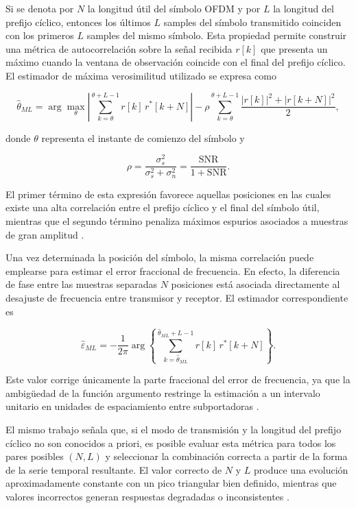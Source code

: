 Si se denota por $N$ la longitud útil del símbolo OFDM y por $L$ la longitud del prefijo cíclico, entonces los últimos $L$ samples del símbolo transmitido coinciden con los primeros $L$ samples del mismo símbolo. Esta propiedad permite construir una métrica de autocorrelación sobre la señal recibida $r[k]$ que presenta un máximo cuando la ventana de observación coincide con el final del prefijo cíclico. El estimador de máxima verosimilitud utilizado se expresa como

\begin{equation}
\hat{\theta}_{ML}
=
\arg \max_{\theta}
\left|
\sum_{k=\theta}^{\theta+L-1} r[k]\,r^{*}[k+N]
\right|
-
\rho
\sum_{k=\theta}^{\theta+L-1}
\frac{|r[k]|^2 + |r[k+N]|^2}{2},
\end{equation}

donde $\theta$ representa el instante de comienzo del símbolo y

\begin{equation}
\rho = \frac{\sigma_s^2}{\sigma_s^2+\sigma_n^2}
      = \frac{\mathrm{SNR}}{1+\mathrm{SNR}}.
\end{equation}

El primer término de esta expresión favorece aquellas posiciones en las cuales existe una alta correlación entre el prefijo cíclico y el final del símbolo útil, mientras que el segundo término penaliza máximos espurios asociados a muestras de gran amplitud \cite{uruguay_rx}.

Una vez determinada la posición del símbolo, la misma correlación puede emplearse para estimar el error fraccional de frecuencia. En efecto, la diferencia de fase entre las muestras separadas $N$ posiciones está asociada directamente al desajuste de frecuencia entre transmisor y receptor. El estimador correspondiente es

\begin{equation}
\hat{\varepsilon}_{ML}
=
-\frac{1}{2\pi}
\arg
\left\{
\sum_{k=\hat{\theta}_{ML}}^{\hat{\theta}_{ML}+L-1}
r[k]\,r^{*}[k+N]
\right\}.
\end{equation}

Este valor corrige únicamente la parte fraccional del error de frecuencia, ya que la ambigüedad de la función argumento restringe la estimación a un intervalo unitario en unidades de espaciamiento entre subportadoras \cite{uruguay_rx}.

El mismo trabajo señala que, si el modo de transmisión y la longitud del prefijo cíclico no son conocidos a priori, es posible evaluar esta métrica para todos los pares posibles $(N,L)$ y seleccionar la combinación correcta a partir de la forma de la serie temporal resultante. El valor correcto de $N$ y $L$ produce una evolución aproximadamente constante con un pico triangular bien definido, mientras que valores incorrectos generan respuestas degradadas o inconsistentes \cite{uruguay_rx}.

